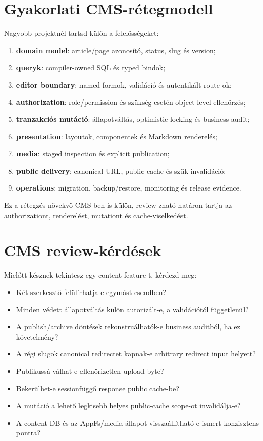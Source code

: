 \section{Gyakorlati CMS-rétegmodell}

Nagyobb projektnél tartsd külön a felelősségeket:

\begin{enumerate}
  \item \textbf{domain model}: article/page azonosító, status, slug és version;
  \item \textbf{queryk}: compiler-owned SQL és typed bindok;
  \item \textbf{editor boundary}: named formok, validáció és autentikált route-ok;
  \item \textbf{authorization}: role/permission és szükség esetén object-level ellenőrzés;
  \item \textbf{tranzakciós mutáció}: állapotváltás, optimistic locking és business audit;
  \item \textbf{presentation}: layoutok, componentek és Markdown renderelés;
  \item \textbf{media}: staged inspection és explicit publication;
  \item \textbf{public delivery}: canonical URL, public cache és szűk invalidáció;
  \item \textbf{operations}: migration, backup/restore, monitoring és release evidence.
\end{enumerate}

Ez a rétegzés növekvő CMS-ben is külön, review-zható határon tartja az authorizationt, renderelést, mutationt és cache-viselkedést.

\section{CMS review-kérdések}

Mielőtt késznek tekintesz egy content feature-t, kérdezd meg:

\begin{itemize}
  \item Két szerkesztő felülírhatja-e egymást csendben?
  \item Minden védett állapotváltás külön autorizált-e, a validációtól függetlenül?
  \item A publish/archive döntések rekonstruálhatók-e business auditból, ha ez követelmény?
  \item A régi slugok canonical redirectet kapnak-e arbitrary redirect input helyett?
  \item Publikussá válhat-e ellenőrizetlen upload byte?
  \item Bekerülhet-e sessionfüggő response public cache-be?
  \item A mutáció a lehető legkisebb helyes public-cache scope-ot invalidálja-e?
  \item A content DB és az AppFs/media állapot visszaállítható-e ismert konzisztens pontra?
\end{itemize}

